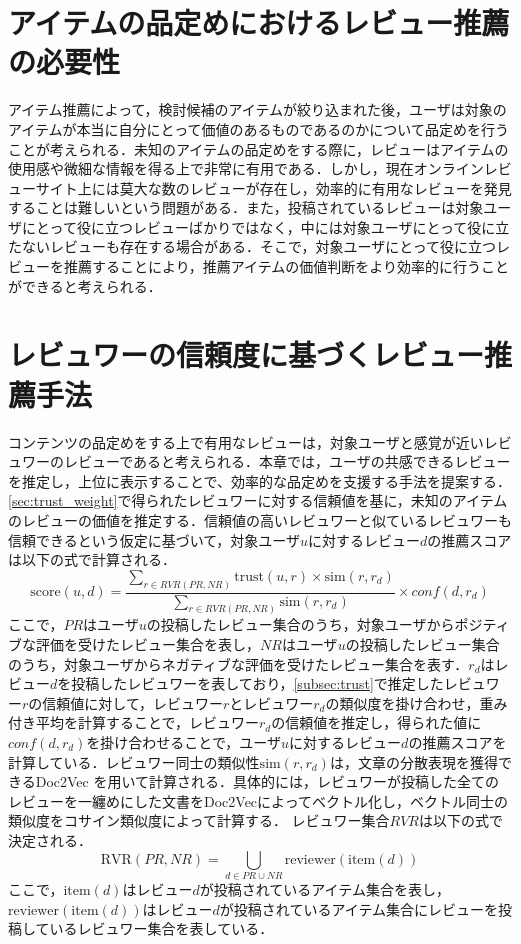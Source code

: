 \documentclass[a4paper,11pt,oneside,openany]{jsbook}
\begin{document}
	\section{アイテムの品定めにおけるレビュー推薦の必要性}
アイテム推薦によって，検討候補のアイテムが絞り込まれた後，ユーザは対象のアイテムが本当に自分にとって価値のあるものであるのかについて品定めを行うことが考えられる．未知のアイテムの品定めをする際に，レビューはアイテムの使用感や微細な情報を得る上で非常に有用である．しかし，現在オンラインレビューサイト上には莫大な数のレビューが存在し，効率的に有用なレビューを発見することは難しいという問題がある．また，投稿されているレビューは対象ユーザにとって役に立つレビューばかりではなく，中には対象ユーザにとって役に立たないレビューも存在する場合がある．そこで，対象ユーザにとって役に立つレビューを推薦することにより，推薦アイテムの価値判断をより効率的に行うことができると考えられる．

	\section{レビュワーの信頼度に基づくレビュー推薦手法}
コンテンツの品定めをする上で有用なレビューは，対象ユーザと感覚が近いレビュワーのレビューであると考えられる．本章では，ユーザの共感できるレビューを推定し，上位に表示することで、効率的な品定めを支援する手法を提案する．
\ref{sec:trust_weight}で得られたレビュワーに対する信頼値を基に，未知のアイテムのレビューの価値を推定する．信頼値の高いレビュワーと似ているレビュワーも信頼できるという仮定に基づいて，対象ユーザ$u$に対するレビュー$d$の推薦スコアは以下の式で計算される．
\begin{equation}
\mathrm{score}(u ,d)=\frac{\sum_{r\in{RVR(PR, NR)}} \mathrm{trust}(u,r) \times \mathrm{sim}(r, r_d)}{\sum_{r\in{RVR(PR, NR)}} \mathrm{sim}(r, r_d)}\times conf(d, r_d)
\end{equation}
ここで，$PR$はユーザ$u$の投稿したレビュー集合のうち，対象ユーザからポジティブな評価を受けたレビュー集合を表し，$NR$はユーザ$u$の投稿したレビュー集合のうち，対象ユーザからネガティブな評価を受けたレビュー集合を表す．$r_d$はレビュー$d$を投稿したレビュワーを表しており，\ref{subsec:trust}で推定したレビュワー$r$の信頼値に対して，レビュワー$r$とレビュワー$r_d$の類似度を掛け合わせ，重み付き平均を計算することで，レビュワー$r_d$の信頼値を推定し，得られた値に$conf(d, r_d)$を掛け合わせることで，ユーザ$u$に対するレビュー$d$の推薦スコアを計算している．レビュワー同士の類似性$\mathrm{sim}(r, r_d)$は，文章の分散表現を獲得できるDoc2Vec \cite{doc2vec} を用いて計算される．具体的には，レビュワーが投稿した全てのレビューを一纏めにした文書をDoc2Vecによってベクトル化し，ベクトル同士の類似度をコサイン類似度によって計算する．
レビュワー集合$RVR$は以下の式で決定される．
\begin{equation}
\mathrm{RVR}(PR ,NR)=\bigcup_{d\in{PR\cup NR}} \mathrm{reviewer}(\mathrm{item}(d))
\end{equation}
ここで，$\mathrm{item}(d)$はレビュー$d$が投稿されているアイテム集合を表し，$\mathrm{reviewer}(\mathrm{item}(d))$はレビュー$d$が投稿されているアイテム集合にレビューを投稿しているレビュワー集合を表している．
\end{document}
